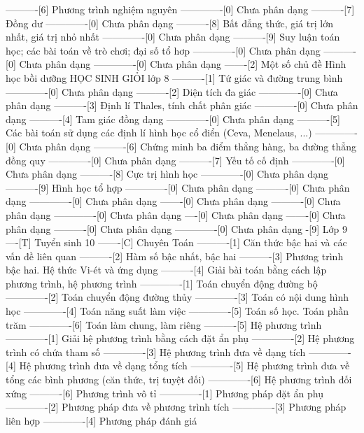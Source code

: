 ----------[6] Phương trình nghiệm nguyên
-------------[0] Chưa phân dạng
----------[7] Đồng dư
-------------[0] Chưa phân dạng
----------[8] Bất đẳng thức, giá trị lớn nhất, giá trị nhỏ nhất
-------------[0] Chưa phân dạng
----------[9] Suy luận toán học; các bài toán về trò chơi; đại số tổ hơp
-------------[0] Chưa phân dạng
----------[0] Chưa phân dạng
-------------[0] Chưa phân dạng
-------[2] Một số chủ đề Hình học bồi dưỡng HỌC SINH GIỎI lớp 8
----------[1] Tứ giác và đường trung bình
-------------[0] Chưa phân dạng
----------[2] Diện tích đa giác
-------------[0] Chưa phân dạng
----------[3] Định lí Thales, tính chất phân giác
-------------[0] Chưa phân dạng
----------[4] Tam giác đồng dạng
-------------[0] Chưa phân dạng
----------[5] Các bài toán sử dụng các định lí hình học cổ điển (Ceva, Menelaus, ...)
-------------[0] Chưa phân dạng
----------[6] Chứng minh ba điểm thẳng hàng, ba đường thẳng đồng quy
-------------[0] Chưa phân dạng
----------[7] Yếu tố cố định
-------------[0] Chưa phân dạng
----------[8] Cực trị hình học
-------------[0] Chưa phân dạng
----------[9] Hình học tổ hợp
-------------[0] Chưa phân dạng
----------[0] Chưa phân dạng
-------------[0] Chưa phân dạng
-------[0] Chưa phân dạng
----------[0] Chưa phân dạng
-------------[0] Chưa phân dạng
----[0] Chưa phân dạng
-------[0] Chưa phân dạng
----------[0] Chưa phân dạng
-------------[0] Chưa phân dạng
-[9] Lớp 9
----[T] Tuyển sinh 10
-------[C] Chuyên Toán
----------[1] Căn thức bậc hai và các vấn đề liên quan
----------[2] Hàm số bậc nhất, bậc hai
----------[3] Phương trình bậc hai. Hệ thức Vi-ét và ứng dụng
----------[4] Giải bài toán bằng cách lập phương trình, hệ phương trình
-------------[1] Toán chuyển động đường bộ
-------------[2] Toán chuyển động đường thủy
-------------[3] Toán có nội dung hình học
-------------[4] Toán năng suất làm việc
-------------[5] Toán số học. Toán phần trăm
-------------[6] Toán làm chung, làm riêng
----------[5] Hệ phương trình
-------------[1] Giải hệ phương trình bằng cách đặt ẩn phụ
-------------[2] Hệ phương trình có chứa tham số
-------------[3] Hệ phương trình đưa về dạng tích
-------------[4] Hệ phương trình đưa về dạng tổng tích
-------------[5] Hệ phương trình đưa về tổng các bình phương (căn thức, trị tuyệt đối)
-------------[6] Hệ phương trình đối xứng
----------[6] Phương trình vô tỉ
-------------[1] Phương pháp đặt ẩn phụ
-------------[2] Phương pháp đưa về phương trình tích
-------------[3] Phương pháp liên hợp
-------------[4] Phương pháp đánh giá
